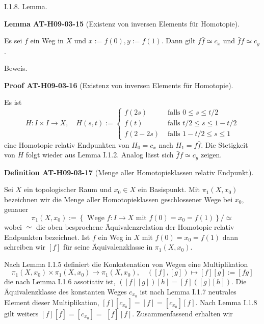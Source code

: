 \documentclass[10pt, letterpaper]{article}
\newcommand{\CustomHeading}[3]{%
  \par\medskip\noindent%
  \textbf{#1 #2} \textnormal{(#3)}.\enskip%
}
\newenvironment{DEF}[2]{\begin{unitbox}\CustomHeading{Definition}{#1}{#2}}{\end{unitbox}}
\newenvironment{LEM}[2]{\begin{unitbox}\CustomHeading{Lemma}{#1}{#2}}{\end{unitbox}}
\newenvironment{PROOF}[2]{\begin{unitbox}\CustomHeading{Proof}{#1}{#2}}{\end{unitbox}}
\begin{document}
I.1.8. Lemma. 


\begin{LEM}{AT-H09-03-15}{Existenz von inversen Elements für Homotopie}
Es sei $f$ ein Weg in $X$ und $x:=f(0), y:=f(1)$. Dann gilt $f \bar{f} \simeq c_{x}$ und $\bar{f} f \simeq c_{y}$.
\end{LEM}

Beweis. 

\begin{PROOF}{AT-H09-03-16}{Existenz von inversen Elements für Homotopie}
Es ist
$$
H: I \times I \rightarrow X, \quad H(s, t):= \begin{cases}f(2 s) & \text { falls } 0 \leq s \leq t / 2 \\ f(t) & \text { falls } t / 2 \leq s \leq 1-t / 2 \\ f(2-2 s) & \text { falls } 1-t / 2 \leq s \leq 1\end{cases}
$$
eine Homotopie relativ Endpunkten von $H_{0}=c_{x}$ nach $H_{1}=f \bar{f}$. Die Stetigkeit von $H$ folgt wieder aus Lemma I.1.2. Analog lässt sich $\bar{f} f \simeq c_{y}$ zeigen.
\end{PROOF}




\begin{DEF}{AT-H09-03-17}{Menge aller Homotopieklassen relativ Endpunkt}
Sei $X$ ein topologischer Raum und $x_{0} \in X$ ein Basispunkt. Mit $\pi_{1}\left(X, x_{0}\right)$ bezeichnen wir die Menge aller Homotopieklassen geschlossener Wege bei $x_{0}$, genauer
$$
\pi_{1}\left(X, x_{0}\right):=\left\{\text { Wege } f: I \rightarrow X \text { mit } f(0)=x_{0}=f(1)\right\} / \simeq
$$
wobei $\simeq$ die oben besprochene Äquivalenzrelation der Homotopie relativ Endpunkten bezeichnet. Ist $f$ ein Weg in $X$ mit $f(0)=x_{0}=f(1)$ dann schreiben wir $[f]$ für seine Äquivalenzklasse in $\pi_{1}\left(X, x_{0}\right)$.
\end{DEF}


Nach Lemma I.1.5 definiert die Konkatenation von Wegen eine Multiplikation
$$
\pi_{1}\left(X, x_{0}\right) \times \pi_{1}\left(X, x_{0}\right) \rightarrow \pi_{1}\left(X, x_{0}\right), \quad([f],[g]) \mapsto[f][g]:=[f g]
$$
die nach Lemma I.1.6 assotiativ ist, $([f][g])[h]=[f]([g][h])$. Die Äquivalenzklasse des konstanten Weges $c_{x_{0}}$ ist nach Lemma I.1.7 neutrales Element dieser Multiplikation, $[f]\left[c_{x_{0}}\right]=[f]=\left[c_{x_{0}}\right][f]$. Nach Lemma I.1.8 gilt weiters $[f][\bar{f}]=\left[c_{x_{0}}\right]=$ $[\bar{f}][f]$. Zusammenfassend erhalten wir
\end{document}
